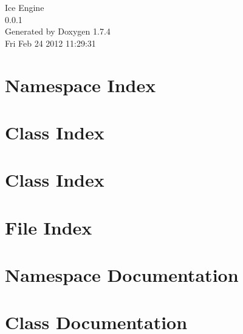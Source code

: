 \documentclass[a4paper]{book}
\begin{document}
\hypersetup{pageanchor=false}
\begin{titlepage}
\vspace*{7cm}
\begin{center}
{\Large Ice Engine \\[1ex]\large 0.0.1 }\\
\vspace*{1cm}
{\large Generated by Doxygen 1.7.4}\\
\vspace*{0.5cm}
{\small Fri Feb 24 2012 11:29:31}\\
\end{center}
\end{titlepage}
\clearemptydoublepage
{}
\tableofcontents
\clearemptydoublepage
{}
\hypersetup{pageanchor=true}
\chapter{Namespace Index}

\chapter{Class Index}

\chapter{Class Index}

\chapter{File Index}

\chapter{Namespace Documentation}






\chapter{Class Documentation}

















\end{document}
